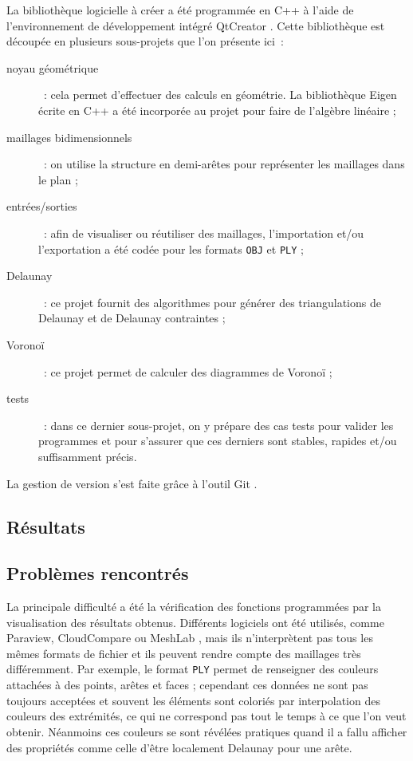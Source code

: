 \documentclass[12pt,a4paper]{report}
\begin{document}
La bibliothèque logicielle à créer a été programmée en C++ à l'aide de l'environnement de développement intégré QtCreator \cite{QtCreator}. Cette bibliothèque est découpée en plusieurs sous-projets que l'on présente ici~:
\begin{description}
\item[noyau géométrique]~: cela permet d'effectuer des calculs en géométrie. La bibliothèque Eigen \cite{Eigen} écrite en C++ a été incorporée au projet pour faire de l'algèbre linéaire ;
\item[maillages bidimensionnels]~: on utilise la structure en demi-arêtes pour représenter les maillages dans le plan ;
\item[entrées/sorties]~: afin de visualiser ou réutiliser des maillages, l'importation et/ou l'exportation a été codée pour les formats \verb+OBJ+ et \verb+PLY+ ;
\item[Delaunay]~: ce projet fournit des algorithmes pour générer des triangulations de Delaunay et de Delaunay contraintes ;
\item[Voronoï]~: ce projet permet de calculer des diagrammes de Voronoï ;
\item[tests]~: dans ce dernier sous-projet, on y prépare des cas tests pour valider les programmes et pour s'assurer que ces derniers sont stables, rapides et/ou suffisamment précis.
\end{description}

La gestion de version s'est faite grâce à l'outil Git \cite{Git}.

\subsection{Résultats}


\subsection{Problèmes rencontrés}

La principale difficulté a été la vérification des fonctions programmées par la visualisation des résultats obtenus. Différents logiciels ont été utilisés, comme Paraview, CloudCompare ou MeshLab \cite{Paraview, CloudCompare, MeshLab}, mais ils n'interprètent pas tous les mêmes formats de fichier et ils peuvent rendre compte des maillages très différemment. Par exemple, le format \verb+PLY+ permet de renseigner des couleurs attachées à des points, arêtes et faces ; cependant ces données ne sont pas toujours acceptées et souvent les éléments sont coloriés par interpolation des couleurs des extrémités, ce qui ne correspond pas tout le temps à ce que l'on veut obtenir. Néanmoins ces couleurs se sont révélées pratiques quand il a fallu afficher des propriétés comme celle d'être localement Delaunay pour une arête.
\end{document}

